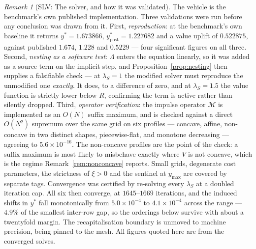 \documentclass[11pt]{article}
\theoremstyle{remark}
\newtheorem{remark}{Remark}
\begin{document}
\begin{remark}[SLV: The solver, and how it was validated]
\label{rem:solver}
The vehicle is the benchmark's own published implementation. Three
validations were run before any conclusion was drawn from it. First,
\emph{reproduction}: at the benchmark's own baseline it returns
$y^*=1.673866$, $y^*_{\mathrm{post}}=1.227682$ and a value uplift of
$0.522875$, against published $1.674$, $1.228$ and $0.5229$ --- four
significant figures on all three. Second, \emph{nesting as a software
test}: $\Lambda$ enters the equation linearly, so it was added as a source
term on the implicit step, and Proposition~\ref{prop:nesting} then
supplies a falsifiable check --- at $\lambda_S=1$ the modified solver must
reproduce the unmodified one \emph{exactly}. It does, to a difference of
zero, and at $\lambda_S=1.5$ the value function is strictly lower below
$R$, confirming the term is active rather than silently dropped.
Third, \emph{operator verification}: the impulse operator $\mathcal{M}$ is
implemented as an $O(N)$ suffix maximum, and is checked against a direct
$O(N^2)$ supremum over the same grid on six profiles --- concave, affine,
non-concave in two distinct shapes, piecewise-flat, and monotone
decreasing --- agreeing to $5.6\times10^{-16}$. The non-concave profiles
are the point of the check: a suffix maximum is most likely to misbehave
exactly where $V$ is not concave, which is the regime
Remark~\ref{rem:nonconcave} reports. Small grids, degenerate cost
parameters, the strictness of $\xi>0$ and the sentinel at $y_{\max}$ are
covered by separate tags.
Convergence was certified by re-solving every $\lambda_S$ at a doubled
iteration cap. All six then converge, at $1645$--$1669$ iterations, and
the induced shifts in $y^*$ fall monotonically from $5.0\times10^{-4}$ to
$4.1\times10^{-4}$ across the range --- $4.9\%$ of the smallest inter-row
gap, so the orderings below survive with about a twentyfold margin. The
recapitalisation boundary is unmoved to machine precision, being pinned to
the mesh. All figures quoted here are from the converged solves.
\end{remark}
\end{document}
